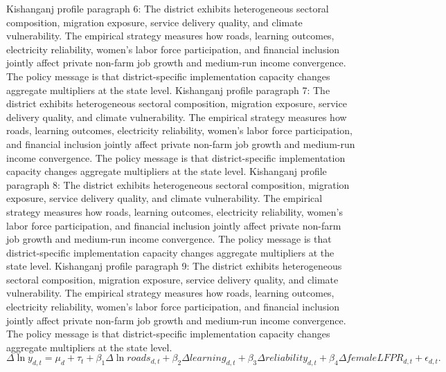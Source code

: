 \documentclass[preprint,12pt]{elsarticle}
\begin{document}
Kishanganj profile paragraph 6: The district exhibits heterogeneous sectoral composition, migration exposure, service delivery quality, and climate vulnerability. The empirical strategy measures how roads, learning outcomes, electricity reliability, women's labor force participation, and financial inclusion jointly affect private non-farm job growth and medium-run income convergence. The policy message is that district-specific implementation capacity changes aggregate multipliers at the state level.
Kishanganj profile paragraph 7: The district exhibits heterogeneous sectoral composition, migration exposure, service delivery quality, and climate vulnerability. The empirical strategy measures how roads, learning outcomes, electricity reliability, women's labor force participation, and financial inclusion jointly affect private non-farm job growth and medium-run income convergence. The policy message is that district-specific implementation capacity changes aggregate multipliers at the state level.
Kishanganj profile paragraph 8: The district exhibits heterogeneous sectoral composition, migration exposure, service delivery quality, and climate vulnerability. The empirical strategy measures how roads, learning outcomes, electricity reliability, women's labor force participation, and financial inclusion jointly affect private non-farm job growth and medium-run income convergence. The policy message is that district-specific implementation capacity changes aggregate multipliers at the state level.
Kishanganj profile paragraph 9: The district exhibits heterogeneous sectoral composition, migration exposure, service delivery quality, and climate vulnerability. The empirical strategy measures how roads, learning outcomes, electricity reliability, women's labor force participation, and financial inclusion jointly affect private non-farm job growth and medium-run income convergence. The policy message is that district-specific implementation capacity changes aggregate multipliers at the state level.
\begin{equation}\Delta \ln y_{d,t}=\mu_d+\tau_t+\beta_1\Delta\ln roads_{d,t}+\beta_2\Delta learning_{d,t}+\beta_3\Delta reliability_{d,t}+\beta_4\Delta femaleLFPR_{d,t}+\epsilon_{d,t}.\end{equation}
\end{document}
